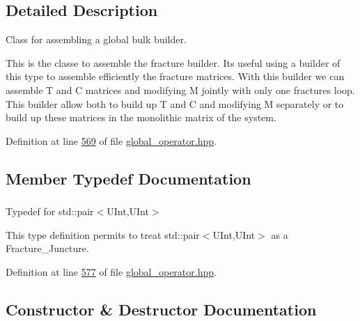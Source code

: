 \subsection{Detailed Description}
Class for assembling a global bulk builder. 

This is the classe to assemble the fracture builder. It\textquotesingle{}s useful using a builder of this type to assemble efficiently the fracture matrices. With this builder we can assemble T and C matrices and modifying M jointly with only one fractures loop. This builder allow both to build up T and C and modifying M separately or to build up these matrices in the monolithic matrix of the system. 

Definition at line \hyperlink{global__operator_8hpp_source_l00569}{569} of file \hyperlink{global__operator_8hpp_source}{global\+\_\+operator.\+hpp}.



\subsection{Member Typedef Documentation}
\subsubsection[{\texorpdfstring{Fracture\+\_\+\+Juncture}{Fracture_Juncture}}]{\hspace{0.3cm}{\ttfamily [private]}}\hypertarget{classFVCode3D_1_1FractureBuilder_a12e64420f8c1478beec1e5900577a915}{}\label{classFVCode3D_1_1FractureBuilder_a12e64420f8c1478beec1e5900577a915}


Typedef for std\+::pair$<$\+U\+Int,\+U\+Int$>$ 

This type definition permits to treat std\+::pair$<$\+U\+Int,\+U\+Int$>$ as a Fracture\+\_\+\+Juncture. 

Definition at line \hyperlink{global__operator_8hpp_source_l00577}{577} of file \hyperlink{global__operator_8hpp_source}{global\+\_\+operator.\+hpp}.



\subsection{Constructor \& Destructor Documentation}
